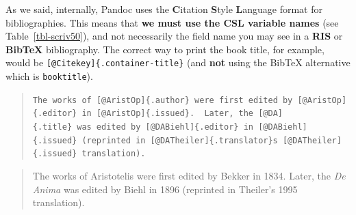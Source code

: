 \documentclass[
  12pt,
  a4paper,
  oneside,
  numbers=noenddot,
  titlepage,
  toclink=all,
  toc=bibliography]{scrbook}
\theoremstyle{definition}
\theoremstyle{definition}
\theoremstyle{definition}
\theoremstyle{plain}
\theoremstyle{plain}
\theoremstyle{plain}
\theoremstyle{plain}
\theoremstyle{plain}
\theoremstyle{remark}
\begin{document}
As we said, internally, Pandoc uses the \textbf{C}itation \textbf{S}tyle
\textbf{L}anguage format for bibliographies. This means that \textbf{we
must use the CSL variable names} (see
\protect\hypertarget{cite_107}{}{\label{cite_107}Table~\ref{tbl-scriv50}}),
and not necessarily the field name you may see in a \textbf{RIS} or
\textbf{BibTeX} bibliography. The correct way to print the book title,
for example, would be \texttt{{[}@Citekey{]}\{.container-title\}} (and
\textbf{not} using the BibTeX alternative which is \texttt{booktitle}).

\begin{quote}
\texttt{The\ works\ of\ {[}@AristOp{]}\{.author\}\ were\ first\ edited\ by\ {[}@AristOp{]}\{.editor\}\ in\ {[}@AristOp{]}\{.issued\}.\ \ Later,\ the\ {[}@DA{]}\{.title\}\ was\ edited\ by\ {[}@DABiehl{]}\{.editor\}\ in\ {[}@DABiehl{]}\{.issued\}\ (reprinted\ in\ {[}@DATheiler{]}\{.translator\}\textquotesingle{}s\ {[}@DATheiler{]}\{.issued\}\ translation).}
\end{quote}

\begin{quote}
The works of Aristotelis were first edited by Bekker in 1834. Later, the
\emph{De Anima} was edited by Biehl in 1896 (reprinted in Theiler's 1995
translation).
\end{quote}
\end{document}
